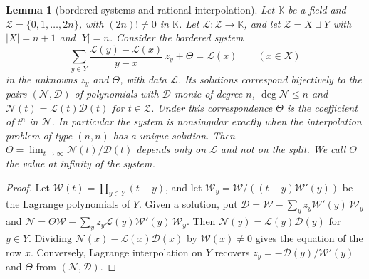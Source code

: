\documentclass[11pt]{amsart}
\newtheorem{lemma}[theorem]{Lemma}
\theoremstyle{definition}
\theoremstyle{remark}
\numberwithin{equation}{section}
\begin{document}
\begin{lemma}[bordered systems and rational interpolation]\label{lem:interp}
Let $\mathbb K$ be a field and $\mathcal Z=\{0,1,\dots,2n\}$, with $(2n)!\ne0$ in $\mathbb K$. Let
$\mathcal L:\mathcal Z\to\mathbb K$, and let $\mathcal Z=X\sqcup Y$ with $|X|=n+1$ and $|Y|=n$. Consider the bordered
system
\[
 \sum_{y\in Y}\frac{\mathcal L(y)-\mathcal L(x)}{y-x}\,z_y+\Theta=\mathcal L(x)\qquad(x\in X)
\]
in the unknowns $z_y$ and $\Theta$, with data $\mathcal L$. Its solutions correspond bijectively to the pairs $(\mathcal N,\mathcal D)$ of
polynomials with $\mathcal D$ monic of degree $n$, $\deg\mathcal N\le n$ and $\mathcal N(t)=\mathcal L(t)\mathcal D(t)$
for $t\in\mathcal Z$. Under this correspondence $\Theta$ is the coefficient of $t^n$ in $\mathcal N$. In particular the
system is nonsingular exactly when the interpolation problem of type $(n,n)$ has a unique solution. Then
$\Theta=\lim_{t\to\infty}\mathcal N(t)/\mathcal D(t)$ depends only on $\mathcal L$ and not on the split. We call $\Theta$ the \emph{value at infinity} of the system.
\end{lemma}
\begin{proof}
Let $\mathcal W(t)=\prod_{y\in Y}(t-y)$, and let $\mathcal W_y=\mathcal W/((t-y)\mathcal W'(y))$ be the Lagrange
polynomials of $Y$. Given a solution, put $\mathcal D=\mathcal W-\sum_yz_y\mathcal W'(y)\,\mathcal W_y$ and
$\mathcal N=\Theta\mathcal W-\sum_yz_y\mathcal L(y)\mathcal W'(y)\,\mathcal W_y$. Then
$\mathcal N(y)=\mathcal L(y)\mathcal D(y)$ for $y\in Y$. Dividing $\mathcal N(x)-\mathcal L(x)\mathcal D(x)$ by
$\mathcal W(x)\ne0$ gives the equation of the row $x$. Conversely, Lagrange interpolation on $Y$ recovers
$z_y=-\mathcal D(y)/\mathcal W'(y)$ and $\Theta$ from $(\mathcal N,\mathcal D)$.
\end{proof}
\end{document}
